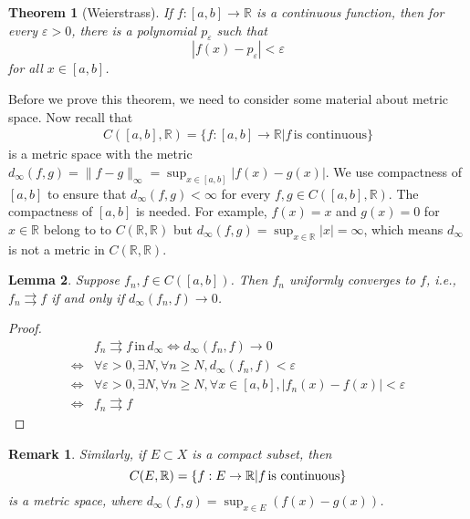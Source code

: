 \documentclass[12pt,leqno]{amsart}
\newtheorem{theorem}{Theorem}[section]
\newtheorem{lemma}[theorem]{Lemma}
\newtheorem{remark}{Remark}[section]
\theoremstyle{definition}
\numberwithin{equation}{subsection}
\begin{document}
\medskip

\begin{theorem}[Weierstrass]\label{Weierstrass_1}
If $f:[a,b]\to\mathbb{R}$ is a continuous function, then for every $\varepsilon > 0$, there is a polynomial $p_\varepsilon$ such that
$$\left|f(x) - p_\varepsilon \right| < \varepsilon$$
for all $x\in[a,b]$.
\end{theorem}

\medskip

Before we prove this theorem, we need to consider some material about metric space. Now recall that 
\begin{align*}
    C([a,b],\mathbb{R}) = \{f:[a,b]\to\mathbb{R} | f\, \text{is continuous}\}
\end{align*}
is a metric space with the metric $d_\infty(f,g) = \|f - g\|_\infty = \sup_{x\in[a,b]} |f(x) - g(x)|$. We use compactness of $[a,b]$ to ensure that $d_\infty(f,g) < \infty$ for every $f,g\in C([a,b],\mathbb{R})$. The compactness of $[a,b]$ is needed. For example, $f(x) = x$ and $g(x) = 0$ for $x\in\mathbb{R}$ belong to to $C(\mathbb{R},\mathbb{R})$ but $d_\infty(f,g) = \sup_{x\in\mathbb{R}}|x| = \infty$, which means $d_\infty$ is not a metric in $C(\mathbb{R},\mathbb{R})$.

\medskip

\begin{lemma}
Suppose $f_n,f\in C([a,b])$. Then $f_n$ uniformly converges to $f$, i.e., $f_n \rightrightarrows f$ if and only if $d_\infty(f_n,f)\to 0$.
\end{lemma}
\begin{proof}
\begin{align*}
    & f_n\rightrightarrows f\, \text{in}\, d_\infty \Leftrightarrow d_\infty(f_n,f)\to 0 \\
    \Leftrightarrow & \forall \varepsilon > 0, \exists N, \forall n\geq N, d_\infty(f_n,f) < \varepsilon \\
    \Leftrightarrow & \forall \varepsilon > 0, \exists N, \forall n\geq N, \forall x\in [a,b], \left|f_n(x) - f(x)\right| < \varepsilon \\
    \Leftrightarrow & f_n \rightrightarrows f
\end{align*}
\end{proof}

\begin{remark}
Similarly, if $E\subset X$ is a compact subset, then $$C(E,\mathbb{R}) = \{f:E\to \mathbb{R} | f\, {\rm is \,\, continuous}\}$$ 
is a metric space, where $d_\infty(f,g) = \sup_{x\in E}\left(f(x)-g(x)\right)$.
\end{remark}
\end{document}
